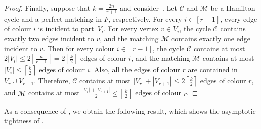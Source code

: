 \documentclass[10pt,a4paper,reqno]{amsart}
\begin{document}
\begin{proof}
\medskip
Finally, suppose that $k = \frac{2n}{r + 1}$ and consider~. Let $\mathcal{C}$ and $\mathcal{M}$ be a Hamilton cycle and a perfect matching in $F$, respectively. For every $i \in [r - 1]$, every edge of colour $i$ is incident to part~$V_i$. For every vertex $v \in V_i$, the cycle $\mathcal{C}$ contains exactly two edges incident to $v$, and the matching $\mathcal{M}$ contains exactly one edge incident to $v$. Then for every colour $i\in [r-1]$, the cycle $\mathcal{C}$ contains at most $2|V_i| \le 2\left\lceil\frac{n}{r + 1}\right\rceil = 2\left\lceil \frac{k}{2} \right\rceil$ edges of colour $i$, and the matching $\mathcal{M}$ contains at most $|V_i| \le \left\lceil \frac{k}{2} \right\rceil$ edges of colour $i$. Also, all the edges of colour $r$ are contained in $V_r \cup V_{r + 1}$. Therefore, $\mathcal{C}$ contains at most $|V_r| + |V_{r + 1}| \le 2\left\lceil \frac{k}{2} \right\rceil$ edges of colour $r$, and $\mathcal{M}$ contains at most $\frac{|V_{r}| + |V_{r + 1}|}{2} \le  \left\lceil \frac{k}{2} \right\rceil$ edges of colour $r$.
\end{proof}


As a consequence of , we obtain the following result, which shows the asymptotic tightness of .
\end{document}
